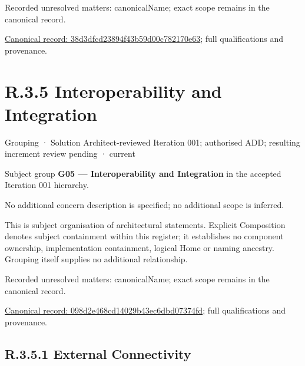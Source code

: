 {\small Recorded unresolved matters: canonicalName; exact scope remains in the canonical record.}\par
{\footnotesize \href{../../../../continuum/grouping/38d3dfcd23894f43b59d00c782170e63.md}{Canonical record: 38d3dfcd23894f43b59d00c782170e63}; full qualifications and provenance.}\par
\section*{R.3.5 Interoperability and Integration}
\label{navigation:R.3.5}

\label{element:098d2e468cd14029b43ec6dbd07374fd}
{\small Grouping · Solution Architect-reviewed Iteration 001; authorised ADD; resulting increment review pending · current}\par

Subject group \textbf{G05 — Interoperability and Integration} in the accepted Iteration 001 hierarchy.



No additional concern description is specified; no additional scope is inferred.



This is subject organisation of architectural statements. Explicit Composition denotes subject containment within this register; it establishes no component ownership, implementation containment, logical Home or naming ancestry. Grouping itself supplies no additional relationship.


{\small Recorded unresolved matters: canonicalName; exact scope remains in the canonical record.}\par
{\footnotesize \href{../../../../continuum/grouping/098d2e468cd14029b43ec6dbd07374fd.md}{Canonical record: 098d2e468cd14029b43ec6dbd07374fd}; full qualifications and provenance.}\par
\subsection*{R.3.5.1 External Connectivity}
\label{navigation:R.3.5.1}

